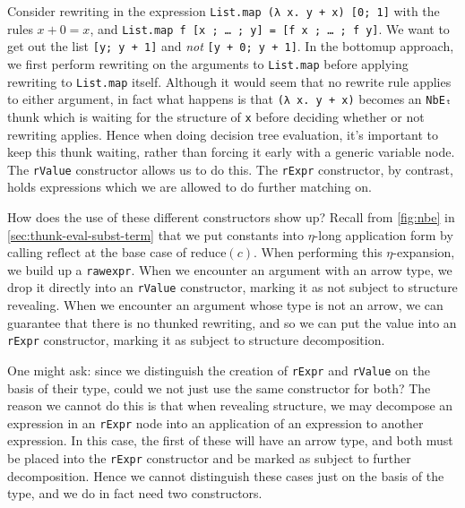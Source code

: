 Consider rewriting in the expression \texttt{List.map (λ x. y + x) [0; 1]} with the rules $x + 0 = x$, and \texttt{List.map f [x ; … ; y] = [f x ; … ; f y]}.
We want to get out the list \texttt{[y; y + 1]} and \emph{not} \texttt{[y + 0; y + 1]}.
In the bottomup approach, we first perform rewriting on the arguments to \texttt{List.map} before applying rewriting to \texttt{List.map} itself.
Although it would seem that no rewrite rule applies to either argument, in fact what happens is that \texttt{(λ x. y + x)} becomes an \texttt{NbEₜ} thunk which is waiting for the structure of \texttt{x} before deciding whether or not rewriting applies.
Hence when doing decision tree evaluation, it's important to keep this thunk waiting, rather than forcing it early with a generic variable node.
The \texttt{rValue} constructor allows us to do this.
The \texttt{rExpr} constructor, by contrast, holds expressions which we are allowed to do further matching on.

How does the use of these different constructors show up?
Recall from \autoref{fig:nbe} in \autoref{sec:thunk-eval-subst-term} that we put constants into $\eta$-long application form by calling $\text{reflect}$ at the base case of $\text{reduce}(c)$.
When performing this $\eta$-expansion, we build up a \texttt{rawexpr}.
When we encounter an argument with an arrow type, we drop it directly into an \texttt{rValue} constructor, marking it as not subject to structure revealing.
When we encounter an argument whose type is not an arrow, we can guarantee that there is no thunked rewriting, and so we can put the value into an \texttt{rExpr} constructor, marking it as subject to structure decomposition.

One might ask: since we distinguish the creation of \texttt{rExpr} and \texttt{rValue} on the basis of their type, could we not just use the same constructor for both?
The reason we cannot do this is that when revealing structure, we may decompose an expression in an \texttt{rExpr} node into an application of an expression to another expression.
In this case, the first of these will have an arrow type, and both must be placed into the \texttt{rExpr} constructor and be marked as subject to further decomposition.
Hence we cannot distinguish these cases just on the basis of the type, and we do in fact need two constructors.

